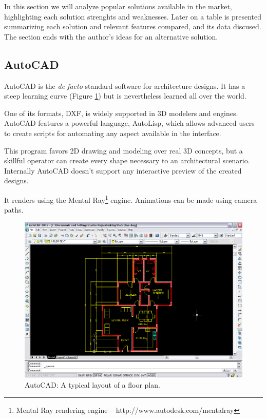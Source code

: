 
In this section we will analyze popular solutions available in the market,
highlighting each solution strenghts and weaknesses.
Later on a table is presented summarizing each solution and relevant features compared, and its
data discused.
The section ends with the author's ideas for an alternative solution.

\subsection{AutoCAD}
AutoCAD is the \emph{de facto} standard software for architecture designs.
It has a steep learning curve (Figure \ref{FIG-AUTOCAD}) but is nevertheless
learned all over the world.

One of its formats, DXF, is widely supported in 3D modelers and engines.
AutoCAD features a powerful language, AutoLisp, which allows advanced users to create scripts for
automating any aspect available in the interface.

This program favors 2D drawing and modeling over real 3D concepts,
but a skillful operator can create every shape necessary to an architectural scenario.
Internally AutoCAD doesn't support any interactive preview of the created designs.

It renders using the Mental Ray\footnote{Mental Ray rendering engine -- http://www.autodesk.com/mentalray}\nocite{SITE-MENTAL} engine.
Animations can be made using camera paths.

\begin{figure}[!ht]
    \centering
    \includegraphics[width=12cm]{gfx/autocad-1.png}
    \caption{AutoCAD: A typical layout of a floor plan.}
    \label{FIG-AUTOCAD}
\end{figure}


